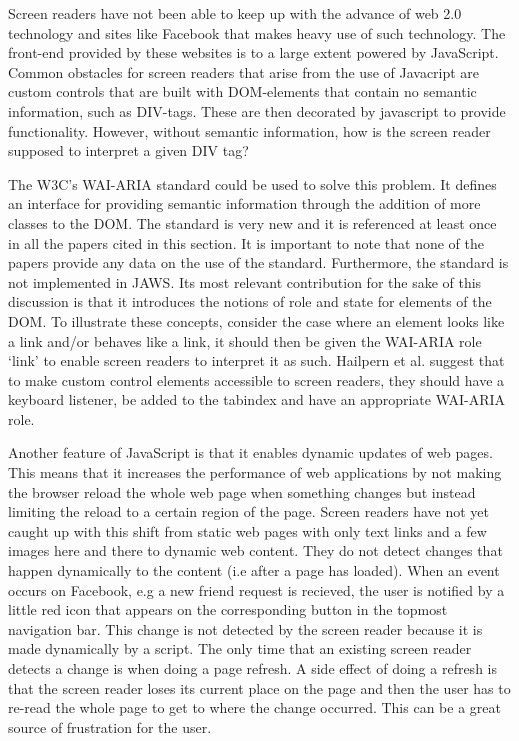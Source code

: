 \documentclass[conference]{IEEEtran}
\begin{document}
Screen readers have not been able to keep up with the advance of web 2.0 technology and sites like Facebook that makes heavy use of such technology. The front-end provided by these websites is to a large extent powered by JavaScript. Common obstacles for screen readers that arise from the use of Javacript are custom controls\cite{ariaprimer} that are built with DOM-elements that contain no semantic information, such as DIV-tags. These are then decorated by javascript to provide functionality. However, without semantic information, how is the screen reader supposed to interpret a given DIV tag?

The W3C’s WAI-ARIA standard\cite{ariaspec} could be used to solve this problem\cite{ariaprimer}. It defines an interface for providing semantic information through the addition of more classes to the DOM. The standard is very new and it is referenced at least once in all the papers cited in this section. It is important to note that none of the papers provide any data on the use of the standard. Furthermore, the standard is not implemented in JAWS\cite{hailpern2009}. Its most relevant contribution for the sake of this discussion is that it introduces the notions of role and state for elements of the DOM. To illustrate these concepts, consider the case where an element looks like a link and/or behaves like a link, it should then be given the WAI-ARIA role `link' to enable screen readers to interpret it as such. Hailpern et al\cite{hailpern2009}. suggest that to make custom control elements accessible to screen readers, they should have a keyboard listener, be added to the tabindex and have an appropriate WAI-ARIA role.

Another feature of JavaScript is that it enables dynamic updates of web pages. This means that it increases the performance of web applications by not making the browser reload the whole web page when something changes but instead limiting the reload to a certain region of the page. Screen readers have not yet caught up with this shift from static web pages with only text links and a few images here and there to dynamic web content. They do not detect changes that happen dynamically to the content (i.e after a page has loaded)\cite{hailpern2009}. When an event occurs on Facebook, e.g a new friend request is recieved, the user is notified by a little red icon that appears on the corresponding button in the topmost navigation bar. This change is not detected by the screen reader\cite{buzzi2010} because it is made dynamically by a script. The only time that an existing screen reader detects a change is when doing a page refresh. A side effect of doing a refresh is that the screen reader loses its current place on the page and then the user has to re-read the whole page to get to where the change occurred. This can be a great source of frustration for the user.\cite{petrie2004}
\end{document}

